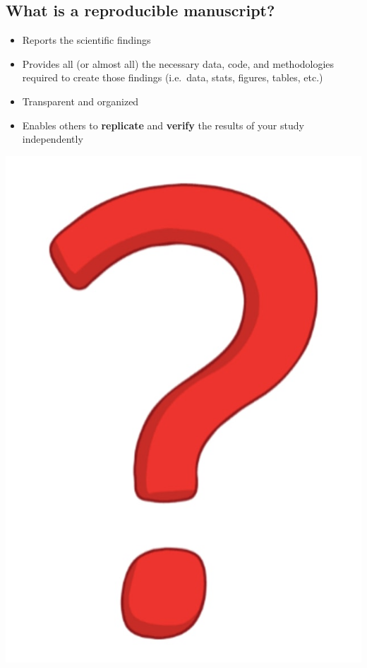 \documentclass[
  letterpaper,
  DIV=11,
  numbers=noendperiod]{scrartcl}
\providecommand{\tightlist}{%
  \setlength{\itemsep}{0pt}\setlength{\parskip}{0pt}}\usepackage{longtable,booktabs,array}
\begin{document}
\subsection{What is a reproducible
manuscript?}\label{what-is-a-reproducible-manuscript}

\begin{itemize}
\tightlist
\item
  Reports the scientific findings
\item
  Provides all (or almost all) the necessary data, code, and
  methodologies required to create those findings (i.e.~data, stats,
  figures, tables, etc.)
\item
  Transparent and organized
\item
  Enables others to \textbf{replicate} and \textbf{verify} the results
  of your study independently
\end{itemize}

\includegraphics{img/qmark.png}
\end{document}
